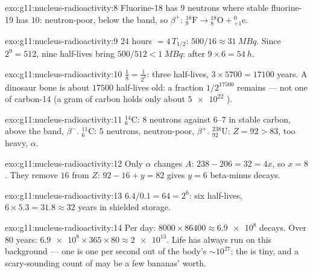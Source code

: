 \begin{solution}{exo:g11:nucleus-radioactivity:8}
Fluorine-18 has $9$ neutrons where stable fluorine-19 has $10$:
neutron-poor, below the band, so $\beta^+$:
${}^{18}_{9}\mathrm{F} \to {}^{18}_{8}\mathrm{O} + {}^{0}_{+1}\mathrm{e}$.
\end{solution}

\begin{solution}{exo:g11:nucleus-radioactivity:9}
$24$ hours $= 4\,T_{1/2}$: $500/16 \approx \qty{31}{MBq}$. Since
$2^9 = 512$, nine half-lives bring $500/512 < \qty{1}{MBq}$: after
$9 \times 6 = \qty{54}{h}$.
\end{solution}

\begin{solution}{exo:g11:nucleus-radioactivity:10}
$\frac18 = \frac1{2^3}$: three half-lives, $3 \times \num{5700} =
\num{17100}$ years. A dinosaur bone is about $\num{17500}$ half-lives old:
a fraction $1/2^{17500}$ remains --- not one  of carbon-14 (a gram of
carbon holds only about $\num{5e22}$ ).
\end{solution}

\begin{solution}{exo:g11:nucleus-radioactivity:11}
${}^{14}_{6}\mathrm{C}$: $8$ neutrons against $6$--$7$ in stable carbon,
above the band, $\beta^-$. ${}^{11}_{6}\mathrm{C}$: $5$ neutrons,
neutron-poor, $\beta^+$. ${}^{238}_{92}\mathrm{U}$: $Z = 92 > 83$, too
heavy, $\alpha$.
\end{solution}

\begin{solution}{exo:g11:nucleus-radioactivity:12}
Only $\alpha$ changes $A$: $238 - 206 = 32 = 4x$, so $x = 8$ . They
remove $16$ from $Z$: $92 - 16 + y = 82$ gives $y = 6$ beta-minus decays.
\end{solution}

\begin{solution}{exo:g11:nucleus-radioactivity:13}
$6.4/0.1 = 64 = 2^{6}$: six half-lives, $6 \times 5.3 = 31.8 \approx 32$
years in shielded storage.
\end{solution}

\begin{solution}{exo:g11:nucleus-radioactivity:14}
Per day: $8000 \times 86400 \approx \num{6.9e8}$ decays. Over $80$ years:
$\num{6.9e8} \times 365 \times 80 \approx \num{2e13}$. Life has always run
on this background --- one  is one  per second out of the
body's $\sim 10^{27}$; the  is tiny, and a scary-sounding count of
 may be a few bananas' worth.
\end{solution}

